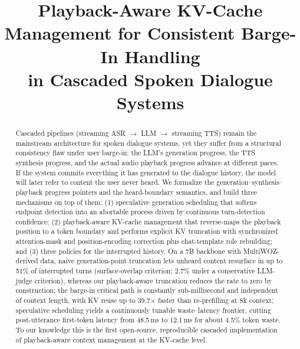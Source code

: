 \documentclass[conference]{IEEEtran}
\begin{document}
\title{Playback-Aware KV-Cache Management for Consistent Barge-In Handling\\in Cascaded Spoken Dialogue Systems}

\author{
\and
{}
}

\maketitle

\begin{abstract}
Cascaded pipelines (streaming ASR $\rightarrow$ LLM $\rightarrow$ streaming TTS) remain the mainstream architecture for spoken dialogue systems, yet they suffer from a structural consistency flaw under user barge-in: the LLM's generation progress, the TTS synthesis progress, and the actual audio playback progress advance at different paces. If the system commits everything it has generated to the dialogue history, the model will later refer to content the user never heard. We formalize the generation--synthesis--playback progress pointers and the heard-boundary semantics, and build three mechanisms on top of them: (1) speculative generation scheduling that softens endpoint detection into an abortable process driven by continuous turn-detection confidence; (2) playback-aware KV-cache management that reverse-maps the playback position to a token boundary and performs explicit KV truncation with synchronized attention-mask and position-encoding correction plus chat-template role rebuilding; and (3) three policies for the interrupted history. On a 7B backbone with MultiWOZ-derived data, naive generation-point truncation lets unheard content resurface in up to 51\% of interrupted turns (surface-overlap criterion; 2.7\% under a conservative LLM-judge criterion), whereas our playback-aware truncation reduces the rate to zero by construction; the barge-in critical path is constantly sub-millisecond and independent of context length, with KV reuse up to 39.7$\times$ faster than re-prefilling at 8k context; speculative scheduling yields a continuously tunable waste--latency frontier, cutting post-utterance first-token latency from 48.5\,ms to 12.1\,ms for about 4.5\% token waste. To our knowledge this is the first open-source, reproducible cascaded implementation of playback-aware context management at the KV-cache level.
\end{abstract}
\end{document}
